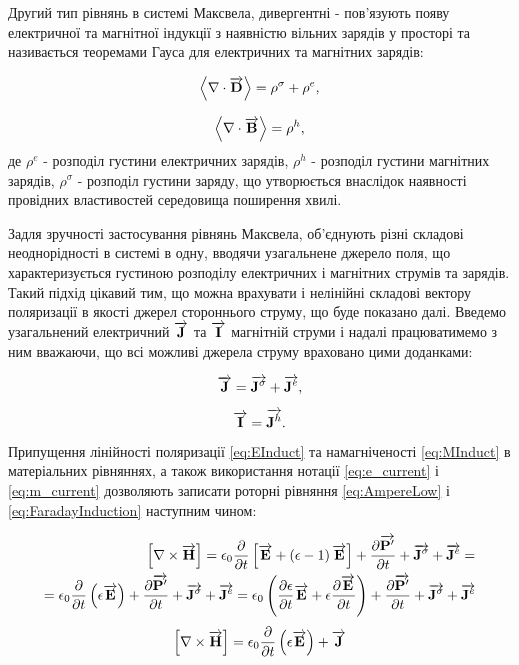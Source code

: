 Другий тип рівнянь в системі Максвела, дивергентні - пов'язують появу 
електричної та магнітної індукції з наявністю вільних зарядів у просторі 
та називається теоремами Гауса для електричних та магнітних зарядів:

\begin{equation} \label{eq:GaussTheorem}
\left< \nabla \cdot \overrightarrow{\mathbf D} \right> = \rho^\sigma + \rho^e,
\end{equation}

\begin{equation} \label{eq:GaussMagnetic}
\left< \nabla \cdot \overrightarrow{\mathbf B} \right> = \rho^h,
\end{equation}
%
де $ \rho^e $ - розподіл густини електричних зарядів, $ \rho^h $ - розподіл
густини магнітних зарядів, $ \rho^\sigma $ - розподіл густини заряду, що
утворюється внаслідок наявності провідних властивостей середовища 
поширення хвилі.

Задля зручності застосування рівнянь Максвела, об'єднують різні складові 
неоднорідності в системі в одну, вводячи узагальнене джерело поля, що 
характеризується густиною розподілу електричних і магнітних струмів та 
зарядів. Такий підхід цікавий тим, що можна врахувати і нелінійні складові 
вектору поляризації в якості джерел стороннього струму, що буде показано далі. 
Введемо узагальнений електричний $ \overrightarrow{\mathbf J} $ та $ \overrightarrow{\mathbf I} $ магнітній 
струми і надалі працюватимемо з ним вважаючи, що всі можливі джерела струму 
враховано цими доданками:

\begin{equation} \label{eq:e_current}
\overrightarrow{\mathbf J} = \overrightarrow{\mathbf J^\sigma} + \overrightarrow{\mathbf J^e},
\end{equation}

\begin{equation} \label{eq:m_current}
\overrightarrow{\mathbf I} = \overrightarrow{\mathbf J^h}.
\end{equation}

Припущення лінійності поляризації \eqref{eq:EInduct} та намагніченості 
\eqref{eq:MInduct} в матеріальних рівняннях, а також використання нотації
\eqref{eq:e_current} і \eqref{eq:m_current} дозволяють записати роторні 
рівняння \eqref{eq:AmpereLow} і \eqref{eq:FaradayInduction} наступним чином:

\textcolor{blue}{ \begin{equation*} \begin{aligned}
\left[ \nabla \times \overrightarrow{\mathbf H} \right] = \epsilon_0 \frac{\partial }{\partial t} \left[ 
\overrightarrow{\mathbf E} + \left( \epsilon - 1 \right) \overrightarrow{\mathbf E} \right] + 
\frac{\partial \overrightarrow{\mathbf P^\prime}}{\partial t} + \overrightarrow{\mathbf J^\sigma} + \overrightarrow{\mathbf J^e}= \\
= \epsilon_0 \frac{\partial }{\partial t} \left( \epsilon \overrightarrow{\mathbf E} \right) +
\frac{\partial \overrightarrow{\mathbf P^\prime}}{\partial t} + \overrightarrow{\mathbf J^\sigma} + \overrightarrow{\mathbf J^e} = 
\epsilon_0 \left( \frac{\partial \epsilon}{\partial t} 
\overrightarrow{\mathbf E} + \epsilon \frac{\partial \overrightarrow{\mathbf E}}{\partial t} \right) + 
\frac{\partial \overrightarrow{\mathbf P^\prime}}{\partial t} + \overrightarrow{\mathbf J^\sigma} + \overrightarrow{\mathbf J^e}
\end{aligned} \end{equation*} }
%
\begin{equation} \label{eq:rotHfromE}
\left[ \nabla \times \overrightarrow{\mathbf H} \right] = 
\epsilon_0 \frac{\partial }{\partial t} \left( \epsilon \overrightarrow{\mathbf E} \right) + \overrightarrow{\mathbf J}
\end{equation}

